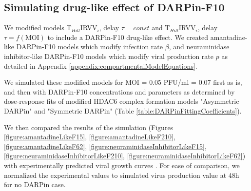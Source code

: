 \subsection{Simulating drug-like effect of DARPin-F10}

We modified models T$_{Hill}$IRVV$_i$, delay $\tau = const$ and T$_{Hill}$IRVV$_i$, delay $\tau = f(\text{MOI})$ to include a DARPin-F10 drug-like effect. We created amantadine-like DARPin-F10 models which modify infection rate $\beta$, and neuraminidase inhibitor-like DARPin-F10 models which modify viral production rate $p$ as detailed in Appendix \ref{appendix:compartmentalModelEquations}.

We simulated these modified models for MOI = 0.05 PFU/ml = 0.07 first as is, and then with DARPin-F10 concentrations and parameters as determined by dose-response fits of modified HDAC6 complex formation models "Asymmetric DARPin" and "Symmetric DARPin" (Table \ref{table:DARPinFittingCoefficients}).

We then compared the results of the simulation (Figures \ref{figure:amantadineLikeF15}, \ref{figure:amantadineLikeF210}, \ref{figure:amantadineLikeF62}, \ref{figure:neuraminidaseInhibitorLikeF15}, \ref{figure:neuraminidaseInhibitorLikeF210}, \ref{figure:neuraminidaseInhibitorLikeF62}) with experimentally predicted viral growth curves \cite{DarpinData}. For ease of comparison, we normalized the experimental values to simulated virus production value at 48h for no DARPin case.

